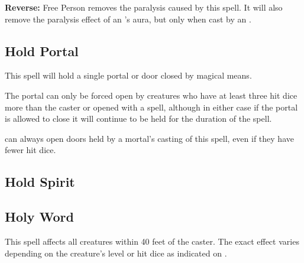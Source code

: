\begin{multicols*}{2}
\textbf{Reverse:} \hypertarget{spell:Free Person}{Free Person} removes the paralysis caused by this spell. It will also remove the paralysis effect of an ’s aura, but only when cast by an .

\subsection{Hold Portal}\label{spell:Hold Portal}

This spell will hold a single portal or door closed by magical means.

The portal can only be forced open by creatures who have at least three hit dice more than the caster or opened with a  spell, although in either case if the portal is allowed to close it will continue to be held for the duration of the spell.

 can always open doors held by a mortal’s casting of this spell, even if they have fewer hit dice.

\subsection{Hold Spirit}\label{spell:Hold Spirit}



\subsection{Holy Word}\label{spell:Holy Word}

This spell affects all creatures within 40 feet of the caster. The exact effect varies depending on the creature’s level or hit dice as indicated on .


\end{multicols*}
